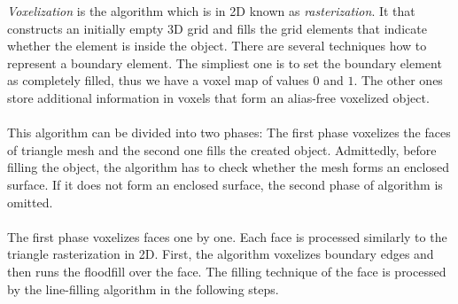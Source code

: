 \emph{Voxelization} is the algorithm which is in 2D known as \emph{rasterization}.
It that constructs an initially empty 3D grid and fills the
grid elements that indicate whether the element is inside the object\cite{Cohen-Or1995}. There are several techniques how to
represent a boundary element. The simpliest one is to set the boundary element as completely filled, 
thus we have a voxel map of values $0$ and $1$. The other ones store additional
information in voxels that form an alias-free voxelized object\cite{Wang1993}.\\
\\
This algorithm can be divided into two phases: The first phase voxelizes the faces of triangle mesh and the
second one fills the created object. Admittedly, before filling the object, the algorithm has to check
whether the mesh forms an enclosed surface. If it does not form an enclosed surface, the second phase of
algorithm is omitted.\\
\\
The first phase voxelizes faces one by one. Each face is processed similarly to the triangle 
rasterization in 2D.
First, the algorithm voxelizes boundary edges and then runs the floodfill over the face. The filling
technique of the face is processed by the line-filling algorithm in the following steps. 

